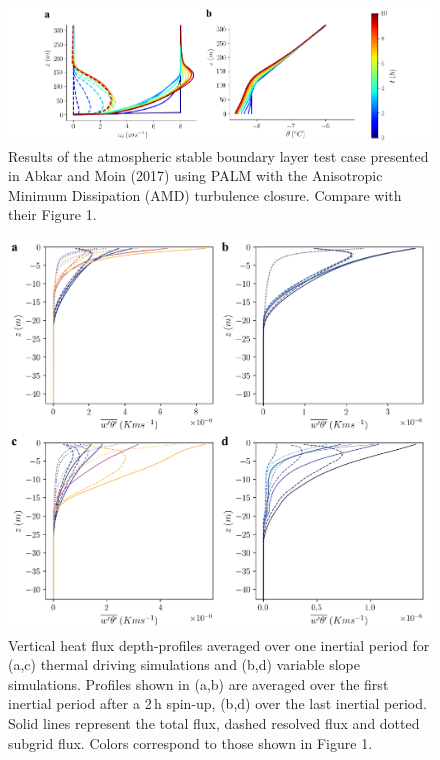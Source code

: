 \documentclass[tc, manuscript]{copernicus}
\begin{document}
\begin{figure}[t]
\includegraphics[width=15cm]{figA1.pdf}
\caption{Results of the atmospheric stable boundary layer test case presented in Abkar and Moin (2017) using PALM with the Anisotropic Minimum Dissipation (AMD) turbulence closure. Compare with their Figure 1.} 
\label{fig:validation}
\end{figure}

\begin{figure}[t]
\includegraphics[width=12cm]{figS1.pdf}
\caption{Vertical heat flux depth-profiles averaged over one inertial period for (a,c) thermal driving simulations and (b,d) variable slope simulations. Profiles shown in (a,b) are averaged over the first inertial period after a 2\,\unit{h} spin-up, (b,d) over the last inertial period. Solid lines
represent the total flux, dashed resolved flux and dotted subgrid flux. Colors correspond to those shown in Figure 1.}
\label{fig:res_sgs_flux}
\end{figure}
\end{document}
